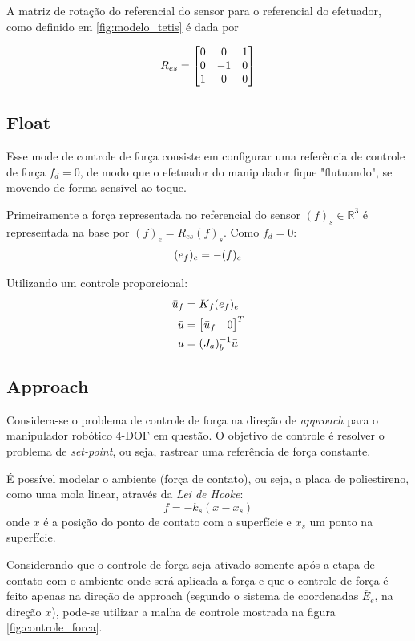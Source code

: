 A matriz de rotação do referencial do sensor para o referencial do efetuador, como definido em \ref{fig:modelo_tetis} é dada por

\begin{equation}
R_{es} = \begin{bmatrix}
  0 & 0 & 1 \\
  0 & -1 & 0 \\
  1 & 0 & 0
\end{bmatrix}
\end{equation}

\subsection{Float}  \label{sec:forca_float}
Esse mode de controle de força consiste em configurar uma referência de controle de força ${f}_d = 0$, de modo que o efetuador do manipulador fique "flutuando", se movendo de forma sensível ao toque.

Primeiramente a força representada no referencial do sensor $({f})_s \in \mathbb{R}^3 $ é representada na base por $({f})_e = R_{es} ({f})_s$.
Como ${f}_d = 0$:
\begin{equation}
({e}_f)_e = - ({f})_e \\
\end{equation}

Utilizando um controle proporcional:
\begin{align}
\bar{{u}}_f &= {K}_f ({e}_f)_e \\
\bar{{u}} &= \begin{bmatrix} \bar{{u}}_f & 0\end{bmatrix}^T\\
{u} &= ({J_a})_b^{-1} \bar{{u}}
\end{align}

\subsection{Approach} \label{sec:forca_approach}
Considera-se o problema de controle de força na direção de \textit{approach} para o manipulador robótico 4-DOF em questão. O objetivo de controle é resolver o problema de \textit{set-point}, ou seja, rastrear uma referência de força constante.

É possível modelar o ambiente (força de contato), ou seja, a placa de poliestireno, como uma mola linear, através da \textit{Lei de Hooke}: 
\begin{equation}
f = -k_s (x - x_s)
\end{equation}
onde $x$ é a posição do ponto de contato com a superfície e $x_s$ um ponto na superfície.

Considerando que o controle de força seja ativado somente após a etapa de contato com o ambiente onde será aplicada a força e que o controle de força é feito apenas na direção de approach (segundo o sistema de coordenadas $\bar{E}_e$, na direção $x$), pode-se utilizar a malha de controle mostrada na figura \ref{fig:controle_forca}.

